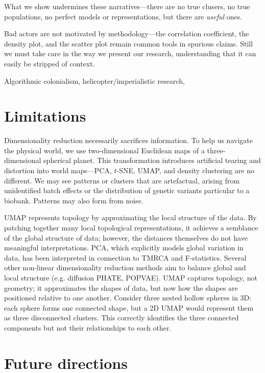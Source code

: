 What we show undermines these narratives---there are no true clusers, no true populations, no perfect models or representations, but there are \textit{useful} ones.

Bad actors are not motivated by methodology---the correlation coefficient, the density plot, and the scatter plot remain common tools in spurious claims. Still we must take care in the way we present our research, understanding that it can easily be stripped of context.

Algorithmic colonialism, helicopter/imperialistic research, 

\citep{gebru_race_2020}


\section{Limitations}

Dimensionality reduction necessarily sacrifices information. To help us navigate the physical world, we use two-dimensional Euclidean maps of a three-dimensional spherical planet. This transformation introduces artificial tearing and distortion into world maps---PCA, $t$-SNE, UMAP, and density clustering are no different. We may see patterns or clusters that are artefactual, arising from unidentified batch effects or the distribution of genetic variants particular to a biobank. Patterns may also form from noise. 

UMAP represents topology by approximating the local structure of the data. By patching together many local topological representations, it achieves a semblance of the global structure of data; however, the distances themselves do not have meaningful interpretations. PCA, which explicitly models global variation in data, has been interpreted in connection to TMRCA and F-statistics\citep{mcvean2009genealogical,peter_geometric_2022}. Several other non-linear dimensionality reduction methods aim to balance global and local structure (e.g. diffusion PHATE\citep{moon2019visualizing}, POPVAE\citep{battey_visualizing_2021}). UMAP captures topology, not geometry; it approximates the shapes of data, but now how the shapes are positioned relative to one another. Consider three nested hollow spheres in $3$D: each sphere forms one connected shape, but a $2$D UMAP would represent them as three disconnected clusters\citep{herrmann_enhancing_2022}. This correctly identifies the three connected components but not their relationships to each other.

\section{Future directions}


